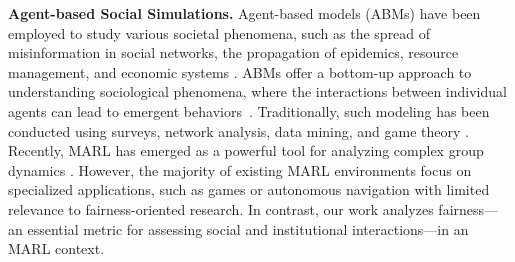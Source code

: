 \label{sec:more-related-works}
\textbf{Agent-based Social Simulations.} 
Agent-based models (ABMs) have been employed to study various societal phenomena, such as the spread of misinformation in social networks, the propagation of epidemics, resource management, and economic systems \cite{perez2009agent,asgharpour2010impact,giabbanelli2021application,benthall2021boundary,gausen2022using}. ABMs offer a bottom-up approach to understanding sociological phenomena, where the interactions between individual agents can lead to emergent behaviors~\cite{elsenbroich2023agent}.
Traditionally, such modeling has been conducted using surveys, network analysis, data mining, and game theory \cite{bonabeau2002agent}. Recently, MARL has emerged as a powerful tool for analyzing complex group dynamics \cite{busoniu2008comprehensive}. However, the majority of existing MARL environments focus on specialized applications, such as games or autonomous navigation \cite{terry2021pettingzoo,li2022metadrive} with limited relevance to fairness-oriented research.  In contrast, our work analyzes fairness---an essential metric for assessing social and institutional interactions---in an MARL context.